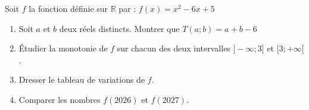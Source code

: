 \begin{Application}[][10 min]
Soit $f$ la fonction définie sur $\mathbb{R}$ par : $f(x) = x^2 - 6x + 5$
\begin{enumerate}
    \item Soit $a$ et $b$ deux réels distincts. Montrer que $T(a;b) = a+b-6$
    \item Étudier la monotonie de $f$ sur chacun des deux intervalles $]-\infty ; 3]$ et $[3 ; +\infty[$.
    \item Dresser le tableau de variations de $f$.
    \item Comparer les nombres $f(2026)$ et $f(2027)$.
\end{enumerate}
\end{Application}
